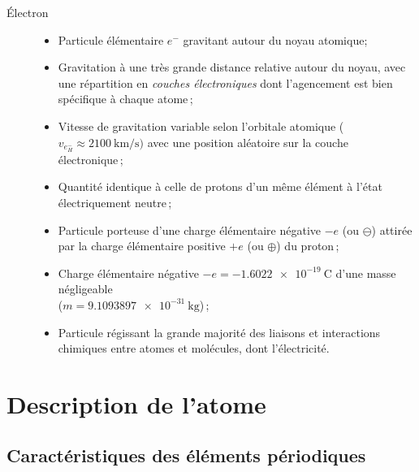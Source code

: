 \begin{description}
	\item[\'Electron]\hfill %
		\begin{itemize}
			\item Particule élémentaire $e^-$ gravitant autour du noyau atomique; %
			\item Gravitation à une très grande distance relative autour du noyau, avec une répartition en \emph{couches électroniques} dont l'agencement est bien spécifique à chaque atome\,;
			\item Vitesse de gravitation variable selon l'orbitale atomique ($v_{e^{-}_H}\approx\SI{2100}{\kilo\meter\per\second})$ avec une position aléatoire sur la couche électronique\,; %
			\item Quantité identique à celle de protons d'un même élément à l'état électriquement neutre\,; 
			\item Particule porteuse d'une charge élémentaire négative $-e$ (ou $\ominus$) attirée par la charge élémentaire positive $+e$ (ou $\oplus$) du proton\,; %
			\item Charge élémentaire négative $-e=\SI{-1,6022e-19}{\coulomb}$ d'une masse négligeable\\($m=\SI{9,1093897e-31}{\kilo\gram}$)\,; %
			\item Particule régissant la grande majorité des liaisons et interactions chimiques entre atomes et molécules, dont l'électricité.
		\end{itemize}

\end{description}

\section{Description de l'atome}

\subsection{Caractéristiques des éléments périodiques}

